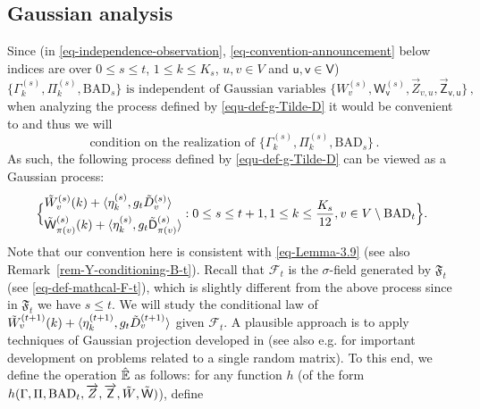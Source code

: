 \documentclass[11pt]{article}
\numberwithin{equation}{section}
\begin{document}
\subsection{Gaussian analysis} \label{sec:Gaussian-analysis}

Since (in \eqref{eq-independence-observation}, \eqref{eq-convention-announcement} below indices are over $0\leq s\leq t$, $1\leq k\leq K_s$, $u, v\in V$ and $\mathsf u, \mathsf v\in \mathsf V$)
\begin{equation}\label{eq-independence-observation}
\{\Gamma^{(s)}_k, \Pi^{(s)}_k, \mathrm{BAD}_s\} \mbox{ is independent of Gaussian variables } \{W^{(s)}_v, \mathsf W^{(s)}_{\mathsf v},  \overrightarrow{Z}_{v,u}, \overrightarrow{\mathsf Z}_{\mathsf v,\mathsf u}\}\,,
\end{equation} when analyzing the process defined by \eqref{equ-def-g-Tilde-D} it would be convenient to and thus we will 
\begin{equation}\label{eq-convention-announcement}
\mbox{ condition on the realization of } \{\Gamma^{(s)}_k, \Pi^{(s)}_k, \mathrm{BAD}_s\}\,. 
\end{equation}
As such,  the following process defined by \eqref{equ-def-g-Tilde-D} can be viewed as a Gaussian process:
\begin{align*}
    \Big\{ \begin{split} & \Tilde{W}^{(s)}_v(k) + \langle \eta^{(s)}_k, g_{t}\Tilde{D}^{(s)}_v \rangle \\ & \Tilde{\mathsf{W}}^{(s)}_{\pi(v)} (k) + \langle \eta^{(s)}_k, g_{t}\Tilde{\mathsf{D}}^{(s)}_{\pi(v)} \rangle  \end{split} : 0 \leq s \leq t+1, 1 \leq k \leq \frac{K_s}{12}, v \in V \setminus \mathrm{BAD}_{t}  \Big\}.
\end{align*}
Note that our convention here is consistent with \eqref{eq-Lemma-3.9} (see also Remark~\ref{rem-Y-conditioning-B-t}).
Recall that $\mathcal{F}_t$ is the $\sigma$-field generated by $\mathfrak{F}_t$ (see \eqref{eq-def-mathcal-F-t}), which is slightly different from the above process since in $\mathfrak F_t$ we have $s\leq t$. We will study the conditional law of $\Tilde{W}^{(t+1)}_v(k) + \langle \eta^{(t+1)}_k, g_{t}\Tilde{D}^{(t+1)}_v \rangle$ given $\mathcal{F}_{t}$. A plausible approach is to apply  techniques of Gaussian projection developed in \cite{DL22+} (see also e.g. \cite{BM10} for important development on problems related to a single random matrix). To this end, we define the operation $\Hat{\mathbb{E}}$ as follows: for any function $h$ (of the form $h ( \Gamma, \Pi, \mathrm{BAD}_t, \overrightarrow{Z}, \overrightarrow{\mathsf{Z}}, \Tilde{W}, \Tilde{\mathsf{W}} )$), define 
\end{document}
